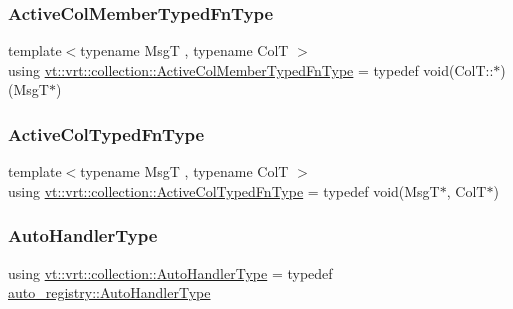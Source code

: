 \subsubsection{\texorpdfstring{Active\+Col\+Member\+Typed\+Fn\+Type}{ActiveColMemberTypedFnType}}
{\footnotesize\ttfamily template$<$typename MsgT , typename ColT $>$ \\
using \hyperlink{namespacevt_1_1vrt_1_1collection_a87925616c03cf4ccc548d33b2fe172ee}{vt\+::vrt\+::collection\+::\+Active\+Col\+Member\+Typed\+Fn\+Type} = typedef void(Col\+T\+::$\ast$)(MsgT$\ast$)}

\mbox{\label{namespacevt_1_1vrt_1_1collection_a1f4b9c5fe895842f49952a29592bc206}} 
\subsubsection{\texorpdfstring{Active\+Col\+Typed\+Fn\+Type}{ActiveColTypedFnType}}
{\footnotesize\ttfamily template$<$typename MsgT , typename ColT $>$ \\
using \hyperlink{namespacevt_1_1vrt_1_1collection_a1f4b9c5fe895842f49952a29592bc206}{vt\+::vrt\+::collection\+::\+Active\+Col\+Typed\+Fn\+Type} = typedef void(MsgT$\ast$, ColT$\ast$)}

\mbox{\label{namespacevt_1_1vrt_1_1collection_af50831782f9d77f86d626f858f295c37}} 
\subsubsection{\texorpdfstring{Auto\+Handler\+Type}{AutoHandlerType}}
{\footnotesize\ttfamily using \hyperlink{namespacevt_1_1vrt_1_1collection_af50831782f9d77f86d626f858f295c37}{vt\+::vrt\+::collection\+::\+Auto\+Handler\+Type} = typedef \hyperlink{namespacevt_1_1auto__registry_ae295e18699146815bb7d7674594d95d7}{auto\+\_\+registry\+::\+Auto\+Handler\+Type}}

\mbox{\label{namespacevt_1_1vrt_1_1collection_a124f83d203352b6bccc4f12ca489b68b}} 

